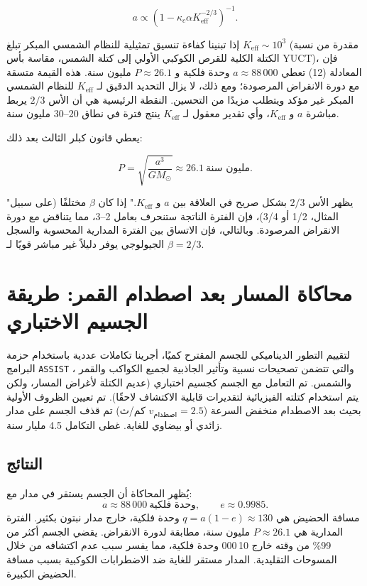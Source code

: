 \documentclass[11pt,a4paper]{article}
\begin{document}
	\[
	a \propto \left(1 - \kappa_c \alpha K_{\mathrm{eff}}^{-2/3}\right)^{-1}.
	\]
	
	إذا تبنينا كفاءة تنسيق تمثيلية للنظام الشمسي المبكر تبلغ \(K_{\mathrm{eff}} \sim 10^3\) (مقدرة من نسبة الكتلة الكلية للقرص الكوكبي الأولي إلى كتلة الشمس، مقاسة بأس YUCT)، فإن المعادلة (12) تعطي \(a \approx 88\,000\) وحدة فلكية و \(P \approx 26.1\) مليون سنة. هذه القيمة متسقة مع دورة الانقراض المرصودة؛ ومع ذلك، لا يزال التحديد الدقيق لـ \(K_{\mathrm{eff}}\) للنظام الشمسي المبكر غير مؤكد ويتطلب مزيدًا من التحسين. النقطة الرئيسية هي أن الأس \(2/3\) يربط مباشرة \(a\) و \(K_{\mathrm{eff}}\)، وأي تقدير معقول لـ \(K_{\mathrm{eff}}\) ينتج فترة في نطاق 20–30 مليون سنة.
	
	يعطي قانون كبلر الثالث بعد ذلك:
	
	\[
	P = \sqrt{\frac{a^3}{GM_{\odot}}} \approx 26.1\ \text{مليون سنة}.
	\]
	
	"يظهر الأس \(2/3\) بشكل صريح في العلاقة بين \(a\) و \(K_{\mathrm{eff}}\)." إذا كان \(\beta\) مختلفًا (على سبيل المثال، 1/2 أو 3/4)، فإن الفترة الناتجة ستنحرف بعامل 2–3، مما يتناقض مع دورة الانقراض المرصودة. وبالتالي، فإن الاتساق بين الفترة المدارية المحسوبة والسجل الجيولوجي يوفر دليلاً غير مباشر قويًا لـ \(\beta = 2/3\).
	
	\section{محاكاة المسار بعد اصطدام القمر: طريقة الجسيم الاختباري}
	
	لتقييم التطور الديناميكي للجسم المقترح كميًا، أجرينا تكاملات عددية باستخدام حزمة البرامج \texttt{ASSIST} \cite{Tamayo2020}، والتي تتضمن تصحيحات نسبية وتأثير الجاذبية لجميع الكواكب والقمر والشمس. تم التعامل مع الجسم كجسيم اختباري (عديم الكتلة لأغراض المسار، ولكن يتم استخدام كتلته الفيزيائية لتقديرات قابلية الاكتشاف لاحقًا). تم تعيين الظروف الأولية بحيث بعد الاصطدام منخفض السرعة (\(v_{\text{اصطدام}} = 2.5\) كم/ث) تم قذف الجسم على مدار زائدي أو بيضاوي للغاية. غطى التكامل 4.5 مليار سنة.
	
	\subsection{النتائج}
	
	يُظهر المحاكاة أن الجسم يستقر في مدار مع:
	\[
	a \approx 88\,000\ \text{وحدة فلكية},\qquad e \approx 0.9985.
	\]
	مسافة الحضيض هي \(q = a(1-e) \approx 130\) وحدة فلكية، خارج مدار نبتون بكثير. الفترة المدارية هي \(P \approx 26.1\) مليون سنة، مطابقة لدورة الانقراض. يقضي الجسم أكثر من 99\% من وقته خارج 10\,000 وحدة فلكية، مما يفسر سبب عدم اكتشافه من خلال المسوحات التقليدية. المدار مستقر للغاية ضد الاضطرابات الكوكبية بسبب مسافة الحضيض الكبيرة.
	
\end{document}
